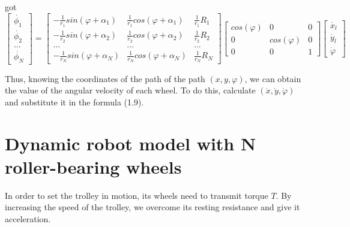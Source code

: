 \documentclass[oneside,final,14pt]{extreport}
\begin{document}
got
\begin{equation}
\begin{bmatrix}
\dot{\phi_{1}} \\
\dot{\phi_{2}} \\
...\\
\dot{\phi_{N}}
\end{bmatrix}
=
\begin{bmatrix}
-\frac{1}{r_{1}}sin(\varphi +\alpha_{1}) &
\frac{1}{r_{1}}cos(\varphi +\alpha_{1}) &
\frac{1}{r_{1}}R_{1}
\\
-\frac{1}{r_{2}}sin(\varphi +\alpha_{2}) &
\frac{1}{r_{2}}cos(\varphi +\alpha_{2}) &
\frac{1}{r_{2}}R_{2}
\\
... & ... & ...
\\
-\frac{1}{r_{N}}sin(\varphi +\alpha_{N}) &
\frac{1}{r_{N}}cos(\varphi +\alpha_{N}) &
\frac{1}{r_{N}}R_{N}
\end{bmatrix}
\begin{bmatrix}
cos(\varphi) & 0 & 0 \\
0 & cos(\varphi) & 0 \\
0 & 0 & 1
\end{bmatrix}
\begin{bmatrix}
\dot{x_{l}} \\
\dot{y_{l}} \\
\dot{\varphi}
\end{bmatrix}
\end{equation}

Thus, knowing the coordinates of the path of the path $ (x, y, \varphi) $, we can obtain the value of the angular velocity of each wheel. To do this, calculate $ (\dot {x}, \dot {y}, \dot {\varphi}) $ and substitute it in the formula (1.9).

\chapter{Dynamic robot model with N roller-bearing wheels}
In order to set the trolley in motion, its wheels need to transmit torque $ T $. By increasing the speed of the trolley, we overcome its resting resistance and give it acceleration.
 
\end{document}
